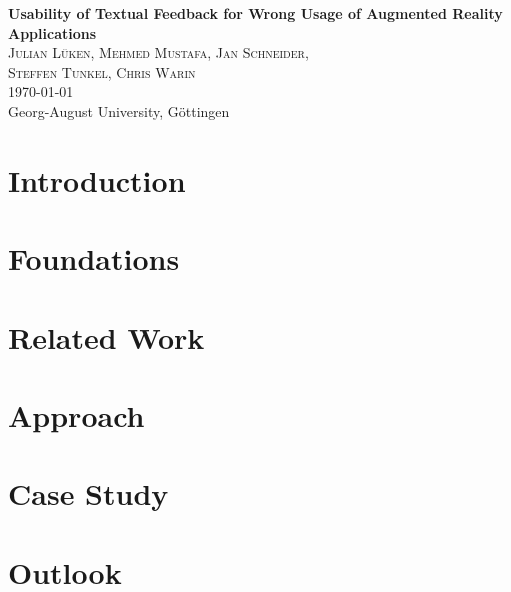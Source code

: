 \documentclass[11pt, a4paper]{article}
\newcommand{\mytitle}{Usability of Textual Feedback for Wrong Usage of Augmented Reality Applications}
\newcommand{\myauthor}{Julian Lüken, Mehmed Mustafa, Jan Schneider,\\ Steffen Tunkel, Chris Warin}
\newcommand{\myuni}{Georg-August University, Göttingen}
\newcommand{\titlespace}{1.5em}
\newenvironment{myabstract}{\begin{abstract}\begin{itshape}}{\end{itshape}\end{abstract}}
\begin{document}
	\pagestyle{empty}
	\begin{center}
		\begin{minipage}{.8\textwidth}
			\centering
			\huge\textbf{\mytitle}\normalsize\\[\titlespace]
			\textsc{\myauthor}\\[\titlespace]
			\today\\[\titlespace]
			\myuni\\[\titlespace]
		\end{minipage}
	\end{center}
	\vspace{\titlespace}
	\begin{myabstract}
		\lipsum[1-3]
	\end{myabstract}
	\pagestyle{myheadings}
	\pagebreak


	\section*{Introduction}

		\lipsum[1]

	\section*{Foundations}
		\lipsum[2]

	\section*{Related Work}
		\lipsum[3]

	\section*{Approach}
		\lipsum[4]

	\section*{Case Study}
		\lipsum[5]

	\section*{Outlook}
		\lipsum[6]\cite{Trivedi1985}

	\pagebreak
	\printbibliography
\restoregeometry
\end{document}

